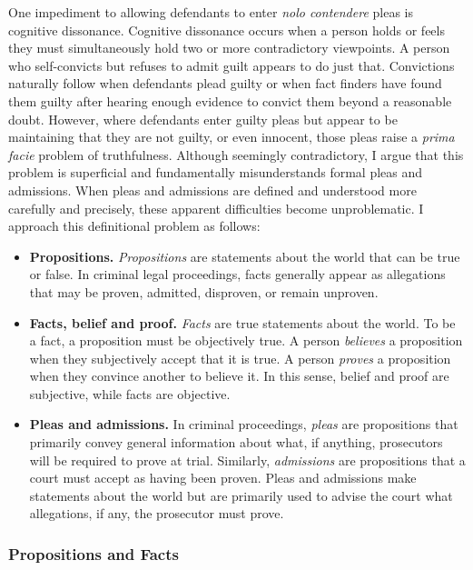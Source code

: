 One impediment to allowing defendants to enter \textit{nolo contendere} pleas is cognitive dissonance. Cognitive dissonance occurs when a person holds or feels they must simultaneously hold two or more contradictory viewpoints. A person who self-convicts but refuses to admit guilt appears to do just that. Convictions naturally follow when defendants plead guilty or when fact finders have found them guilty after hearing enough evidence to convict them beyond a reasonable doubt. However, where defendants enter guilty pleas but appear to be maintaining that they are not guilty, or even innocent, those pleas raise a \textit{prima facie} problem of truthfulness. Although seemingly contradictory, I argue that this problem is superficial and fundamentally misunderstands formal pleas and admissions. When pleas and admissions are defined and understood more carefully and precisely, these apparent difficulties become unproblematic. I approach this definitional problem as follows:

\begin{itemize}
    \item \textbf{Propositions.} \textit{Propositions} are statements about the world that can be true or false. In criminal legal proceedings, facts generally appear as allegations that may be proven, admitted, disproven, or remain unproven.
    \item \textbf{Facts, belief and proof.} \textit{Facts} are true statements about the world. To be a fact, a proposition must be objectively true. A person \textit{believes} a proposition when they subjectively accept that it is true. A person \textit{proves} a proposition when they convince another to believe it. In this sense, belief and proof are subjective, while facts are objective.
    \item \textbf{Pleas and admissions.} In criminal proceedings, \textit{pleas} are propositions that primarily convey general information about what, if anything, prosecutors will be required to prove at trial. Similarly, \textit{admissions} are propositions that a court must accept as having been proven. Pleas and admissions make statements about the world but are primarily used to advise the court what allegations, if any, the prosecutor must prove.
\end{itemize}

\subsubsection{Propositions and Facts}

